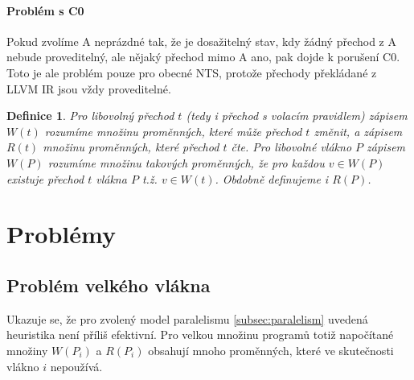 \documentclass[10pt,a4paper,notitlepage]{report}
\newtheorem{definition}{Definice}
\begin{document}
\paragraph{Problém s C0}
Pokud zvolíme A neprázdné tak, že je dosažitelný stav, kdy žádný přechod z A nebude proveditelný, ale nějaký přechod mimo A ano, pak dojde k porušení C0. Toto je ale problém pouze pro obecné NTS, protože přechody překládané z LLVM IR jsou vždy proveditelné. 



\begin{definition}
Pro libovolný přechod $t$ (tedy i přechod s volacím pravidlem) zápisem $W(t)$ rozumíme množinu proměnných, které může přechod $t$ změnit, a zápisem $R(t)$ množinu proměnných, které přechod $t$ čte. Pro libovolné vlákno $P$ zápisem $W(P)$ rozumíme množinu takových proměnných, že pro každou $v \in W(P)$ existuje přechod $t$ vlákna $P$ t.ž. $v \in W(t)$. Obdobně definujeme i $R(P)$.
\end{definition}

\section{Problémy}

\subsection{Problém velkého vlákna}
Ukazuje se, že pro zvolený model paralelismu \ref{subsec:paralelism} uvedená heuristika není příliš efektivní. Pro velkou množinu programů  totiž napočítané množiny $W(P_i)$ a $R(P_i)$ obsahují mnoho proměnných, které ve skutečnosti vlákno $i$ nepoužívá.
\end{document}

